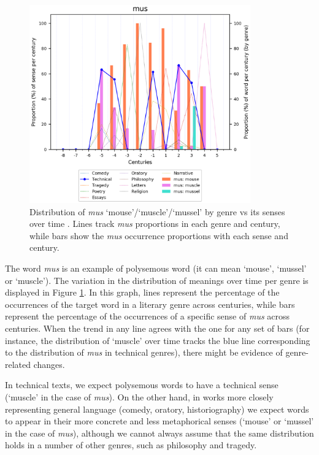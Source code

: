 \documentclass[output=paper%
]{langscibook}
\begin{document}
\begin{figure}
\includegraphics[width=0.85\textwidth]{figures/PERRONE_mus.png}
\caption{Distribution of \emph{mus} `mouse'/`muscle'/`mussel' by genre vs its senses over time \citep{perrone-etal-2019-gasc}. Lines track \emph{mus} proportions in each genre and century, while bars show the \emph{mus} occurrence proportions with each sense and century.\label{musvar}}
\end{figure}

The word \emph{mus} is an example of polysemous word (it can mean `mouse', `mussel' or `muscle'). The variation in the distribution of meanings over time per genre is displayed in Figure \ref{musvar}. In this graph, lines represent the percentage of the occurrences of the target word in a literary genre across centuries, while bars represent the percentage of the occurrences of a specific sense of \emph{mus} across centuries. When the trend in any line agrees with the one for any set of bars (for instance, the distribution of `muscle' over time tracks the blue line corresponding to the distribution of \emph{mus} in technical genres), there might be evidence of genre-related changes.

In technical texts, we expect polysemous words to have a technical sense (`muscle' in the case of \emph{mus}). On the other hand, in works more closely representing general language (comedy, oratory, historiography) we expect words to appear in their more concrete and less metaphorical senses (`mouse' or `mussel' in the case of \emph{mus}), although we cannot always assume that the same distribution holds in a number of other genres, such as philosophy and tragedy.
\end{document}
